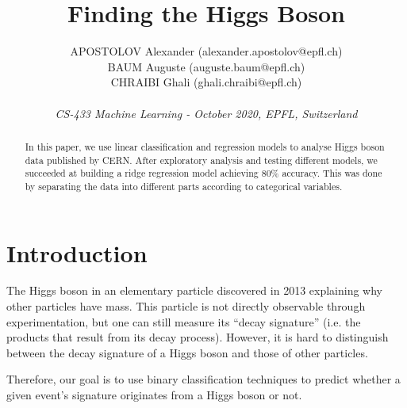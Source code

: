 \documentclass[10pt,conference,compsocconf]{IEEEtran}
\begin{document}
\title{{\LARGE Finding the Higgs Boson}\vspace{-3mm}}    

\author{
  APOSTOLOV Alexander (alexander.apostolov@epfl.ch)\\
  BAUM Auguste (auguste.baum@epfl.ch)\\
  CHRAIBI Ghali (ghali.chraibi@epfl.ch)\\
  \\
  \textit{CS-433 Machine Learning - October 2020, EPFL, Switzerland}
}
\maketitle

\begin{abstract}
  In this paper, we use linear classification and regression models
  to analyse Higgs boson data published by CERN.
  After exploratory analysis and testing different models, we succeeded at building a ridge regression model achieving 80\% accuracy. This was done by separating the data into different parts according to categorical variables.
  
\end{abstract}

\section{Introduction}

The Higgs boson in an elementary particle discovered in 2013 explaining why other particles have mass. This particle is not directly observable through experimentation, but one can still measure its ``decay signature'' (i.e. the products that result from its decay process). However, it is hard to distinguish between the decay signature of a Higgs boson and those of other particles.

Therefore, our goal is to use binary classification techniques to predict whether a given event’s signature originates from a Higgs boson or not.
\end{document}
